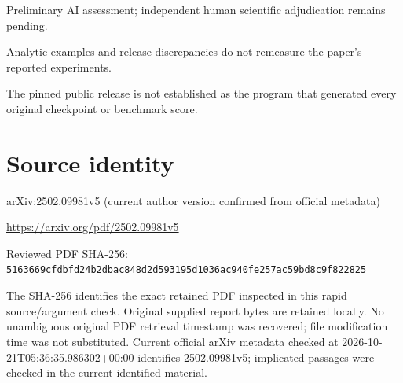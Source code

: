 \documentclass[11pt]{article}
\begin{document}
Preliminary AI assessment; independent human scientific adjudication remains pending.\par

Analytic examples and release discrepancies do not remeasure the paper’s reported experiments.\par

The pinned public release is not established as the program that generated every original checkpoint or benchmark score.\par

\section*{Source identity}

arXiv:2502.09981v5 (current author version confirmed from official metadata)

\url{https://arxiv.org/pdf/2502.09981v5}

Reviewed PDF SHA-256: \nolinkurl{5163669cfdbfd24b2dbac848d2d593195d1036ac940fe257ac59bd8c9f822825}

The SHA-256 identifies the exact retained PDF inspected in this rapid source/argument check. Original supplied report bytes are retained locally. No unambiguous original PDF retrieval timestamp was recovered; file modification time was not substituted. Current official arXiv metadata checked at 2026-10-21T05:36:35.986302+00:00 identifies 2502.09981v5; implicated passages were checked in the current identified material.
\end{document}
